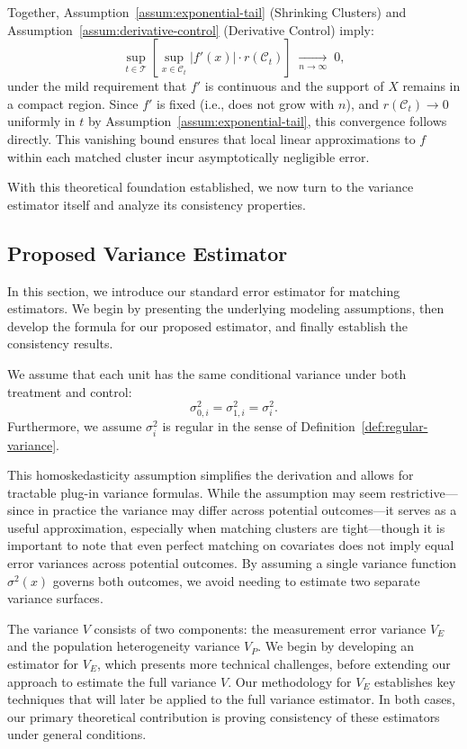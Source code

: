 \documentclass{mytemplate}
\begin{document}
Together, Assumption~\ref{assum:exponential-tail} (Shrinking Clusters) and Assumption~\ref{assum:derivative-control} (Derivative Control) imply:
\[
\sup_{t \in \mathcal{T}}
\left[
  \sup_{x \in \mathcal{C}_t} \bigl|f'(x)\bigr| \cdot r(\mathcal{C}_t)
\right]
\;\xrightarrow[n \to \infty]{}\; 0,
\]
under the mild requirement that $f'$ is continuous and the support of $X$ remains in a compact region. Since $f'$ is fixed (i.e., does not grow with $n$), and $r(\mathcal{C}_t) \to 0$ uniformly in $t$ by Assumption~\ref{assum:exponential-tail}, this convergence follows directly. This vanishing bound ensures that local linear approximations to $f$ within each matched cluster incur asymptotically negligible error. 

With this theoretical foundation established, we now turn to the variance estimator itself and analyze its consistency properties.


\subsection{Proposed Variance Estimator}
\label{sec:variance-estimator}

In this section, we introduce our standard error estimator for matching estimators. We begin by presenting the underlying modeling assumptions, then develop the formula for our proposed estimator, and finally establish the consistency results.

\begin{assumption}
\label{assum:homoskedastic}
We assume that each unit has the same conditional variance under both treatment and control:
\[
\sigma_{0,i}^2 = \sigma_{1,i}^2 = \sigma_i^2.
\]
Furthermore, we assume $\sigma_i^2$ is regular in the sense of Definition~\ref{def:regular-variance}.
\end{assumption}

This homoskedasticity assumption simplifies the derivation and allows for tractable plug-in variance formulas. While the assumption may seem restrictive—since in practice the variance may differ across potential outcomes—it serves as a useful approximation, especially when matching clusters are tight—though it is important to note that even perfect matching on covariates does not imply equal error variances across potential outcomes. By assuming a single variance function $\sigma^2(x)$ governs both outcomes, we avoid needing to estimate two separate variance surfaces.

The variance $V$ consists of two components: the measurement error variance $V_E$ and the population heterogeneity variance $V_P$. We begin by developing an estimator for $V_E$, which presents more technical challenges, before extending our approach to estimate the full variance $V$. Our methodology for $V_E$ establishes key techniques that will later be applied to the full variance estimator. In both cases, our primary theoretical contribution is proving consistency of these estimators under general conditions.
\end{document}
